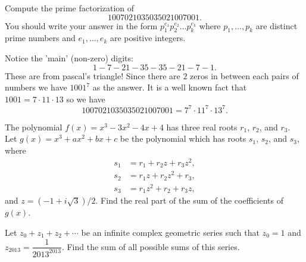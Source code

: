 %	




\begin{question}[name={2013 HMMT, Guts, \href{https://artofproblemsolving.com/community/c129h526551p2986211}{Problem 11}}]
	Compute the prime factorization of $$1007021035035021007001.$$ You should write your answer in the form $p_1^{e_1}p_2^{e_2}\ldots p_k^{e_k}$ where $p_1,\ldots,p_k$ are distinct prime numbers and $e_1,\ldots,e_k$ are positive integers.
\end{question}




\begin{solution}[name={Solution by forthegreatergood}]
	Notice the 'main' (non-zero) digits:
	$$1 - 7 -21 - 35 - 35 - 21 - 7 - 1.$$
	These are from pascal's triangle! Since there are $2$ zeros in between each pairs of numbers we have $1001^7$ as the answer. It is a well known fact that $1001 = 7 \cdot 11\cdot 13$ so we have $$1007021035035021007001 = \boxed{7^7\cdot 11^7\cdot 13^7}.$$
\end{solution}






\begin{question}[name={2013 HMMT, Guts, \href{https://artofproblemsolving.com/community/c129h526560p2986230}{Problem 20}}]
	The polynomial $f(x)=x^3-3x^2-4x+4$ has three real roots $r_1$, $r_2$, and $r_3$. Let $g(x)=x^3+ax^2+bx+c$ be the polynomial which has roots $s_1$, $s_2$, and $s_3$, where
	\begin{align*}
		s_1 &= r_1+r_2z+r_3z^2,\\
		s_2 &= r_1z+r_2z^2+r_3,\\
		s_3 &= r_1z^2+r_2+r_3z,
	\end{align*}
	and $z=({-1+i\sqrt3})/2.$ Find the real part of the sum of the coefficients of $g(x)$.	
\end{question}




%	







\begin{question}[name={2013 HMMT, Guts, \href{https://artofproblemsolving.com/community/c129h526568p2986247}{Problem 28}}]
	Let $z_0+z_1+z_2+\cdots$ be an infinite complex geometric series such that $z_0=1$ and $z_{2013}=\dfrac 1{2013^{2013}}$. Find the sum of all possible sums of this series.
\end{question}




